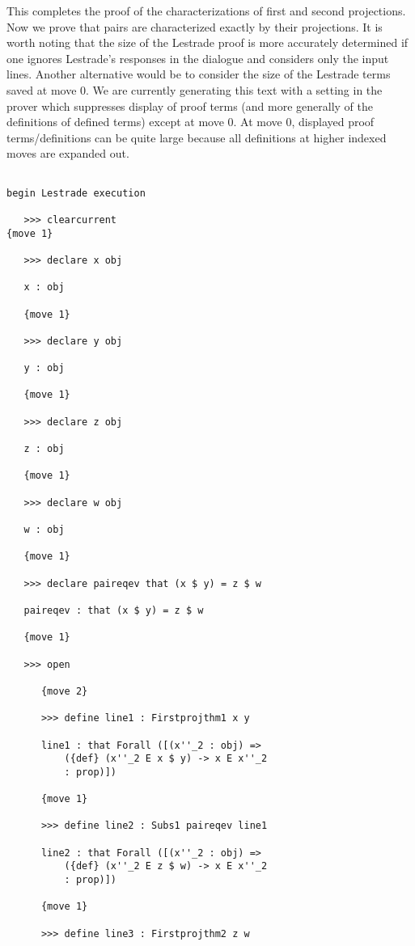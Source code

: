 \documentclass[12pt]{article}
\begin{document}
This completes the proof of the characterizations of first and second projections.  Now we prove that pairs are characterized exactly by their projections.  It is worth noting that
the size of the Lestrade proof is more accurately determined if one ignores Lestrade's responses in the dialogue and considers only the input lines.  Another alternative would be to consider the size of the Lestrade terms saved at move 0.  We are currently generating this text with a setting in the prover which suppresses display of proof terms
(and more generally of the definitions of defined terms) except at move 0.  At move 0, displayed proof terms/definitions can be quite large because all definitions at higher indexed moves are expanded out.

\begin{verbatim}

begin Lestrade execution

   >>> clearcurrent
{move 1}

   >>> declare x obj

   x : obj

   {move 1}

   >>> declare y obj

   y : obj

   {move 1}

   >>> declare z obj

   z : obj

   {move 1}

   >>> declare w obj

   w : obj

   {move 1}

   >>> declare paireqev that (x $ y) = z $ w

   paireqev : that (x $ y) = z $ w

   {move 1}

   >>> open

      {move 2}

      >>> define line1 : Firstprojthm1 x y

      line1 : that Forall ([(x''_2 : obj) => 
          ({def} (x''_2 E x $ y) -> x E x''_2 
          : prop)])

      {move 1}

      >>> define line2 : Subs1 paireqev line1

      line2 : that Forall ([(x''_2 : obj) => 
          ({def} (x''_2 E z $ w) -> x E x''_2 
          : prop)])

      {move 1}

      >>> define line3 : Firstprojthm2 z w


\end{verbatim}
\end{document}
